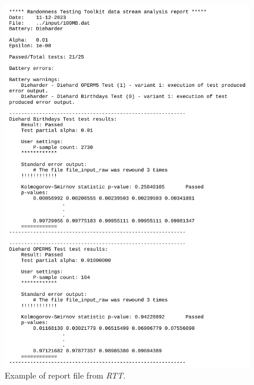 \documentclass[
  digital,     %
  oneside,     %
  nosansbold,  %
  nocolorbold, %
  nolof,         %
  nolot,         %
]{fithesis4}
\begin{document}
\begin{figure}[h!]
  \begin{center}
    \includegraphics[width=11cm]{figures/rtt/rtt-output.jpg}
  \end{center}
  \caption{Example of report file from \emph{RTT}.}
  \label{fig:rtt_output}
\end{figure}

\newpage
\end{document}
